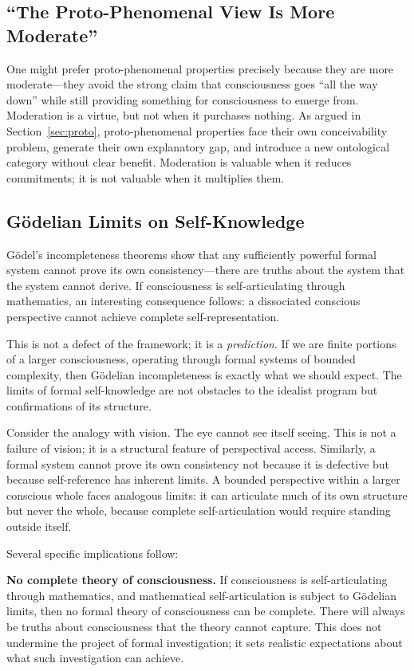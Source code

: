 \documentclass[11pt,a4paper]{article}
\theoremstyle{definition}
\theoremstyle{plain}
\theoremstyle{remark}
\begin{document}
\subsection{``The Proto-Phenomenal View Is More Moderate''}

One might prefer proto-phenomenal properties precisely because they are more moderate---they avoid the strong claim that consciousness goes ``all the way down'' while still providing something for consciousness to emerge from. Moderation is a virtue, but not when it purchases nothing. As argued in Section~\ref{sec:proto}, proto-phenomenal properties face their own conceivability problem, generate their own explanatory gap, and introduce a new ontological category without clear benefit. Moderation is valuable when it reduces commitments; it is not valuable when it multiplies them.

\subsection{G\"odelian Limits on Self-Knowledge}\label{sec:godel}

G\"odel's incompleteness theorems show that any sufficiently powerful formal system cannot prove its own consistency---there are truths about the system that the system cannot derive. If consciousness is self-articulating through mathematics, an interesting consequence follows: a dissociated conscious perspective cannot achieve complete self-representation.

This is not a defect of the framework; it is a \textit{prediction}. If we are finite portions of a larger consciousness, operating through formal systems of bounded complexity, then G\"odelian incompleteness is exactly what we should expect. The limits of formal self-knowledge are not obstacles to the idealist program but confirmations of its structure.

Consider the analogy with vision. The eye cannot see itself seeing. This is not a failure of vision; it is a structural feature of perspectival access. Similarly, a formal system cannot prove its own consistency not because it is defective but because self-reference has inherent limits. A bounded perspective within a larger conscious whole faces analogous limits: it can articulate much of its own structure but never the whole, because complete self-articulation would require standing outside itself.

Several specific implications follow:

\textbf{No complete theory of consciousness.} If consciousness is self-articulating through mathematics, and mathematical self-articulation is subject to G\"odelian limits, then no formal theory of consciousness can be complete. There will always be truths about consciousness that the theory cannot capture. This does not undermine the project of formal investigation; it sets realistic expectations about what such investigation can achieve.
\end{document}
